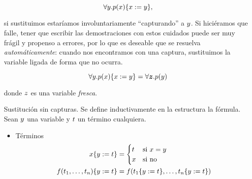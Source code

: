 \[
    \forall y . p(x)\{x := y\},
\]

si sustituimos  estaríamos involuntariamente ``capturando'' a $y$. Si hiciéramos que falle, tener que escribir las demostraciones con estos cuidados puede ser muy frágil y propenso a errores, por lo que es deseable que se resuelva \textit{automáticamente}: cuando nos encontramos con una captura, sustituimos la variable ligada de forma que no ocurra.

\[
    \forall y . p(x)\{x := y\} =
    \forall \bm{z} . p(y)
\]

donde $z$ es una variable \textit{fresca}.

\begin{definition}{Sustitución sin capturas}. Se define inductivamente en la estructura la fórmula. Sean $y$ una variable y $t$ un término cualquiera.
    \begin{itemize}
        \item Términos
        \begin{align*}
            x\{y := t\} &= \begin{cases}
                t &\text{si } x = y\\
                x &\text{si no}
            \end{cases}\\
            f(t_1, \dots, t_n)\{y := t\} &=
                f(
                    t_1\{y := t\},
                    \dots,
                    t_n\{y := t\}
                )
        \end{align*}


\end{itemize}
\end{definition}
